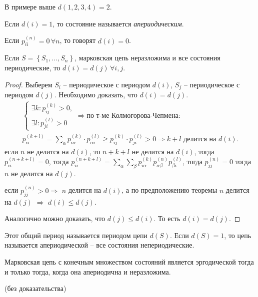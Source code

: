 В примере выше $d(1, 2, 3, 4) = 2$.

\begin{definition}
  Если $d(i) = 1$, то состояние называется \emph{апериодическим}.

  Если $p_{ii}^{(n)} = 0 \, \forall n$, то говорят $d(i) = 0$.
\end{definition}



\begin{theorem}
  Если $S = \left\{ S_1, \dots, S_n \right\} $, марковская цепь неразложима и все состояния
  периодические, то $d(i) = d(j) \, \forall i, j$.
\end{theorem}
\begin{proof}
  Выберем $S_i$ -- периодическое с периодом $d(i)$, $S_j$ -- периодическое с периодом $d(j)$.
  Необходимо доказать, что $d(i) = d(j)$.
  \begin{multline*}
    \begin{cases}
    \exists k : p_{ij}^{(k)} > 0, \\
      \exists l : p_{ji}^{(l)} > 0
    \end{cases}
    \Rightarrow \text{по т-ме Колмогорова-Чепмена: } \\
    p_{ii}^{(k+l)} = \sum_{\alpha} p_{i\alpha}^{(k)} \cdot p_{\alpha i}^{(l)} 
    \geqslant p_{ij}^{(k)} \cdot p_{ji}^{(l)} > 0
    \Rightarrow
    k+l \text{ делится на $d(i)$}.
  \end{multline*}
  если $n$ не делится на $d(i)$, то $n+k+l$ не делится на $d(i)$, тогда $p_{ii}^{(n+k+l)} = 0$, 
  тогда $p_{ii}^{(n+k+l)} = \sum_{\alpha} \sum_\beta p_{i\alpha}^{(k)} p_{\alpha \beta}^{(n)} 
  p_{\beta i}^{(l)}$, тогда $p_{jj}^{(n)} = 0$ тогда $n$ не делится на $d(j)$.

  если $p_{jj}^{(n)} > 0 \Rightarrow$ $n$ делится на $d(i)$, а по предположению теоремы $n$ делится 
  на $d(j)$ $\Rightarrow$ $d(i) \leqslant d(j)$.

  Аналогично можно доказать, что $d(j) \leqslant d(i)$. То есть $d(i) = d(j)$.
\end{proof}

\begin{definition}
  Этот общий период называется периодом цепи $d(S)$.
  Если $d(S) = 1$, то цепь называется апериодической -- все состояния непериодические.
\end{definition}

\begin{theorem}
  Марковская цепь с конечным множеством состояний является эргодической тогда и только тогда,
  когда она апериодична и неразложима.
\end{theorem}
(без доказательства)

